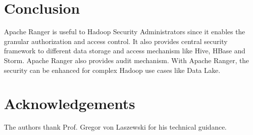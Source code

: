 \documentclass[9pt,twocolumn,twoside]{../../styles/osajnl}
\begin{document}
\section{Conclusion}
Apache Ranger is useful to Hadoop Security Administrators since it enables
the granular authorization and access control. It also provides central
security framework to different data storage and access mechanism like Hive,
HBase and Storm. Apache Ranger also provides audit mechanism. With Apache
Ranger, the security can be enhanced for complex Hadoop use cases like Data
Lake.

\section*{Acknowledgements}

The authors thank Prof. Gregor von Laszewski for his technical guidance.



\end{document}

